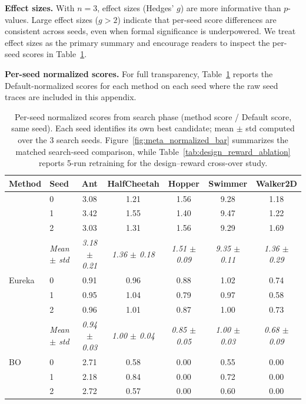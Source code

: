\textbf{Effect sizes.} With $n{=}3$, effect sizes (Hedges' $g$) are more informative than $p$-values. Large effect sizes ($g > 2$) indicate that per-seed score differences are consistent across seeds, even when formal significance is underpowered. We treat effect sizes as the primary summary and encourage readers to inspect the per-seed scores in Table~\ref{tab:per_seed_scores}.



\textbf{Per-seed normalized scores.} For full transparency, Table~\ref{tab:per_seed_scores} reports the Default-normalized scores for each method on each seed where the raw seed traces are included in this appendix.

\begin{table}[htbp]
\centering
\caption{Per-seed normalized scores from search phase (method score / Default score, same seed). Each seed identifies its own best candidate; mean $\pm$ std computed over the 3 search seeds. Figure~\ref{fig:meta_normalized_bar} summarizes the matched search-seed comparison, while Table~\ref{tab:design_reward_ablation} reports 5-run retraining for the design--reward cross-over study.}
\label{tab:per_seed_scores}
\small
\setlength{\tabcolsep}{3pt}
\begin{tabular}{@{}llccccc@{}}
\toprule
Method & Seed & Ant & HalfCheetah & Hopper & Swimmer & Walker2D \\
\midrule
\abbrev{} & 0 & 3.08 & 1.21 & 1.56 & 9.28 & 1.18 \\
 & 1 & 3.42 & 1.55 & 1.40 & 9.47 & 1.22 \\
 & 2 & 3.03 & 1.31 & 1.56 & 9.29 & 1.69 \\
 & \textit{Mean $\pm$ std} & \textit{3.18 $\pm$ 0.21} & \textit{1.36 $\pm$ 0.18} & \textit{1.51 $\pm$ 0.09} & \textit{9.35 $\pm$ 0.11} & \textit{1.36 $\pm$ 0.29} \\
\midrule
Eureka & 0 & 0.91 & 0.96 & 0.88 & 1.02 & 0.74 \\
 & 1 & 0.95 & 1.04 & 0.79 & 0.97 & 0.58 \\
 & 2 & 0.96 & 1.01 & 0.87 & 1.00 & 0.73 \\
 & \textit{Mean $\pm$ std} & \textit{0.94 $\pm$ 0.03} & \textit{1.00 $\pm$ 0.04} & \textit{0.85 $\pm$ 0.05} & \textit{1.00 $\pm$ 0.03} & \textit{0.68 $\pm$ 0.09} \\
\midrule
BO & 0 & 2.71 & 0.58 & 0.00 & 0.55 & 0.00 \\
 & 1 & 2.18 & 0.84 & 0.00 & 0.72 & 0.00 \\
 & 2 & 2.72 & 0.57 & 0.00 & 0.60 & 0.00 \\

\end{tabular}
\end{table}
